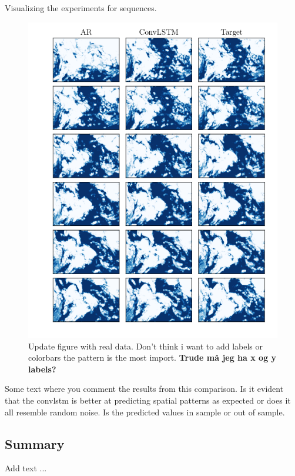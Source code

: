 Visualizing the experiments for sequences.
\begin{figure}[ht]
    \centering
    \includegraphics[sale=0.1]{python_figs/example_predicted_sequence_2010-09-01.png}
    \caption{Update figure with real data. Don't think i want to add labels or colorbars the pattern is the most import. \textbf{Trude må jeg ha x og y labels?} }
    \label{fig:target_predict_era5_horizontal}
\end{figure}

Some text where you comment the results from this comparison. Is it evident that the \acrshort{convlstm} is better at predicting spatial patterns as expected or does it all resemble random noise. Is the predicted values in sample or out of sample.


\subsection{Summary} \label{sec:summary_num}
Add text ... 

\clearpage
